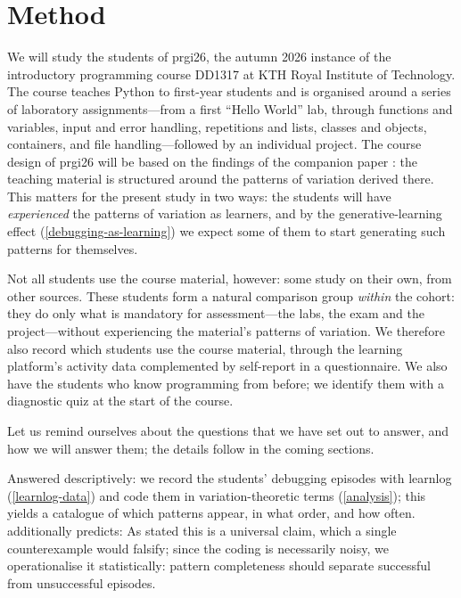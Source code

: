 \mode*
\section{Method}
\label{method}

We will study the students of prgi26, the autumn 2026 instance of the
introductory programming course DD1317 at KTH Royal Institute of Technology.
The course teaches Python to first-year students and is organised around a
series of laboratory assignments---from a first \enquote{Hello World} lab,
through functions and variables, input and error handling, repetitions and
lists, classes and objects, containers, and file handling---followed by an
individual project.
The course design of prgi26 will be based on the findings of the companion
paper \autocite{VTProgMisconceptions}: the teaching material is structured
around the patterns of variation derived there.
This matters for the present study in two ways: the students will have
\emph{experienced} the patterns of variation as learners, and by the
generative-learning effect (\cref{debugging-as-learning}) we expect some of
them to start generating such patterns for themselves.

Not all students use the course material, however: some study on their own,
from other sources.
These students form a natural comparison group \emph{within} the cohort: they
do only what is mandatory for assessment---the labs, the exam and the
project---without experiencing the material's patterns of variation.
We therefore also record which students use the course material, through the
learning platform's activity data complemented by self-report in a
questionnaire.
We also have the students who know programming from before; we identify
them with a diagnostic quiz at the start of the course.

Let us remind ourselves about the questions that we have set out to
answer, and how we will answer them; the details follow in the coming
sections.

\rqpatterns*
Answered descriptively: we record the students' debugging episodes with
learnlog (\cref{learnlog-data}) and code them in variation-theoretic terms
(\cref{analysis}); this yields a catalogue of which patterns appear, in
what order, and how often.
 additionally predicts:
\hpatterns*
As stated this is a universal claim, which a single counterexample would
falsify; since the coding is necessarily noisy, we operationalise it
statistically: pattern completeness should separate successful from
unsuccessful episodes.

